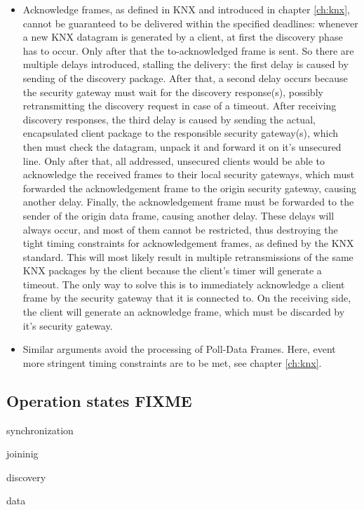 \begin{itemize}
 \item Acknowledge frames, as defined in KNX and introduced in chapter \ref{ch:knx}, cannot be guaranteed to be delivered within the specified deadlines: whenever
 a new KNX datagram is generated by a client, at first the discovery phase has to occur. Only after that the to-acknowledged frame is sent. So there are
 multiple delays introduced, stalling the delivery: the first delay is caused by sending of the discovery package.
 After that, a second delay occurs because the security gateway must wait for the discovery response(s), possibly retransmitting the discovery request
 in case of a timeout. After receiving discovery responses, the third delay is caused by sending the actual, encapsulated
 client package to the responsible security gateway(s), which then must check the datagram, unpack it and forward it on it's unsecured line.
 Only after that, all addressed, unsecured clients would be able to acknowledge the received frames
 to their local security gateways,
 which must forwarded the acknowledgement frame to the origin security gateway, causing another delay. Finally, the acknowledgement frame must be forwarded to the sender of
 the origin data frame, causing another delay.
 These delays will always occur, and most of them cannot be restricted, thus destroying the tight timing constraints for acknowledgement frames, as defined
 by the KNX standard. This
 will most likely result in multiple retransmissions of the same KNX packages
 by the client because the client's timer will generate a timeout. The only way to solve this is to immediately acknowledge a client frame by the security
 gateway that it is connected to. On the receiving side, the client will generate an acknowledge
 frame, which must be discarded by it's security gateway.
 \item Similar arguments avoid the processing of Poll-Data Frames. Here, event more stringent timing constraints are to be met, see chapter \ref{ch:knx}. 
\end{itemize}

\subsection{Operation states FIXME}

synchronization

joininig

discovery

data
